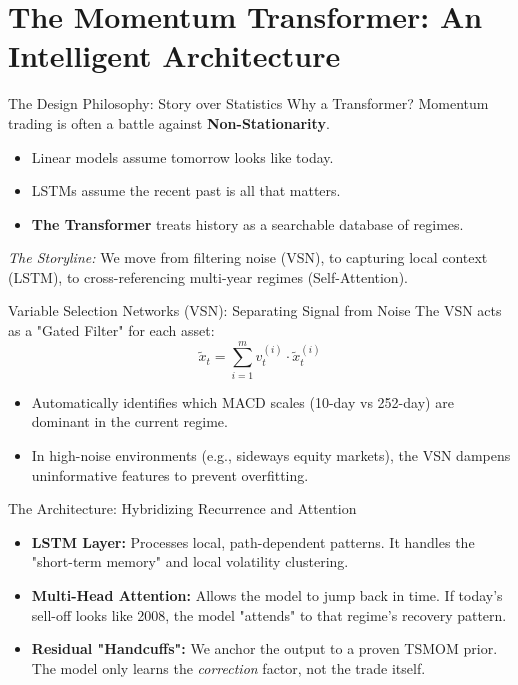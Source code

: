 \section{The Momentum Transformer: An Intelligent Architecture}

\begin{frame}{The Design Philosophy: Story over Statistics}
    Why a Transformer? Momentum trading is often a battle against \textbf{Non-Stationarity}.
    \begin{itemize}
        \item Linear models assume tomorrow looks like today.
        \item LSTMs assume the recent past is all that matters.
        \item \textbf{The Transformer} treats history as a searchable database of regimes.
    \end{itemize}
    \textit{The Storyline:} We move from filtering noise (VSN), to capturing local context (LSTM), to cross-referencing multi-year regimes (Self-Attention).
\end{frame}

\begin{frame}{Variable Selection Networks (VSN): Separating Signal from Noise}
    The VSN acts as a "Gated Filter" for each asset:
    \begin{equation}
        \tilde{x}_t = \sum_{i=1}^m v_t^{(i)} \cdot \tilde{x}_t^{(i)}
    \end{equation}
    \begin{itemize}
        \item Automatically identifies which MACD scales (10-day vs 252-day) are dominant in the current regime.
        \item In high-noise environments (e.g., sideways equity markets), the VSN dampens uninformative features to prevent overfitting.
    \end{itemize}
\end{frame}

\begin{frame}{The Architecture: Hybridizing Recurrence and Attention}
    \begin{itemize}
        \item \textbf{LSTM Layer:} Processes local, path-dependent patterns. It handles the "short-term memory" and local volatility clustering.
        \item \textbf{Multi-Head Attention:} Allows the model to jump back in time. If today's sell-off looks like 2008, the model "attends" to that regime's recovery pattern.
        \item \textbf{Residual "Handcuffs":} We anchor the output to a proven TSMOM prior. The model only learns the \textit{correction} factor, not the trade itself.
    \end{itemize}
\end{frame}

